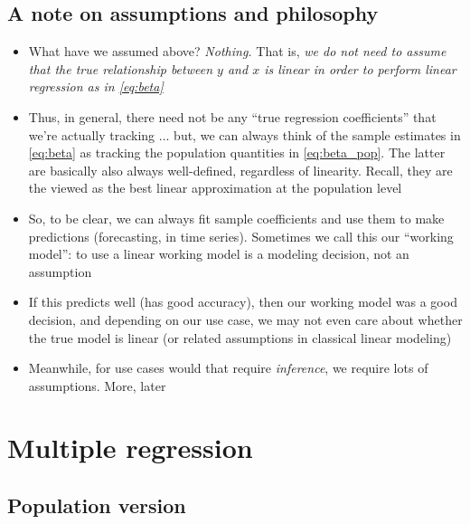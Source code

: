 \documentclass{article}
\begin{document}
\subsection{A note on assumptions and philosophy}

\begin{itemize}
\item What have we assumed above? \emph{Nothing.} That is, \emph{we do  
    not need to assume that the true relationship between $y$ and $x$ is linear
    in order to perform linear regression as in \eqref{eq:beta}}

\item Thus, in general, there need not be any ``true regression coefficients'' 
  that we're actually tracking ... but, we can always think of the sample
  estimates  in \eqref{eq:beta} as tracking 
  the population quantities  in
  \eqref{eq:beta_pop}. The latter are basically also always well-defined, 
  regardless of linearity. Recall, they are the viewed as the best linear
  approximation at the population level 

\item So, to be clear, we can always fit sample coefficients  and use them to make predictions (forecasting, in time
  series). Sometimes we call this our ``working model'': to use a linear working
  model is a modeling decision, not an assumption  

\item If this predicts well (has good accuracy), then our working model was a
  good decision, and depending on our use case, we may not even care about
  whether the true model is linear (or related assumptions in classical linear
  modeling) 

\item Meanwhile, for use cases would that require \emph{inference}, we require
  lots of assumptions. More, later
\end{itemize}

\section{Multiple regression}

\subsection{Population version}
\end{document}

